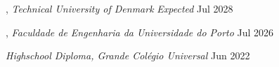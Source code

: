 , \textit{Technical University of Denmark} \hfill	\textit{Expected} Jul 2028

, \textit{Faculdade de Engenharia da Universidade do Porto} \hfill	Jul 2026

\textit{Highschool Diploma, Grande Colégio Universal} 	\hfill Jun 2022


